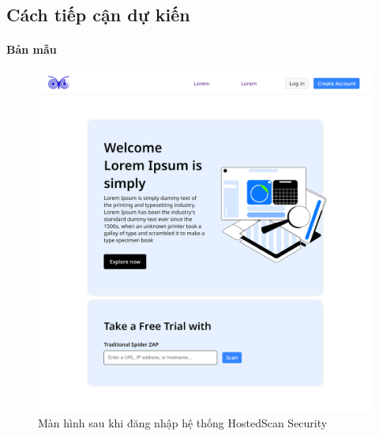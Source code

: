 \subsection*{Cách tiếp cận dự kiến}
\paragraph{Bản mẫu}
\vspace{1cm}

\begin{figure}[H]
    \centering
    \includegraphics[width=\textwidth]{images/prototype/prototype_22112022/home.png}
    \caption{Màn hình sau khi đăng nhập hệ thống HostedScan Security}
\end{figure}

